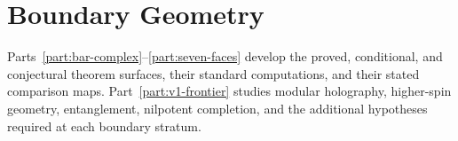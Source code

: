 \documentclass[11pt]{memoir}
\begin{document}


%
\section*{Boundary Geometry}
\label{part:v1-frontier}

\noindent
Parts~\ref{part:bar-complex}--\ref{part:seven-faces} develop the
proved, conditional, and conjectural theorem surfaces, their standard
computations, and their stated comparison maps.
Part~\ref{part:v1-frontier} studies modular holography, higher-spin
geometry, entanglement, nilpotent completion, and the additional
hypotheses required at each boundary stratum.












\end{document}
